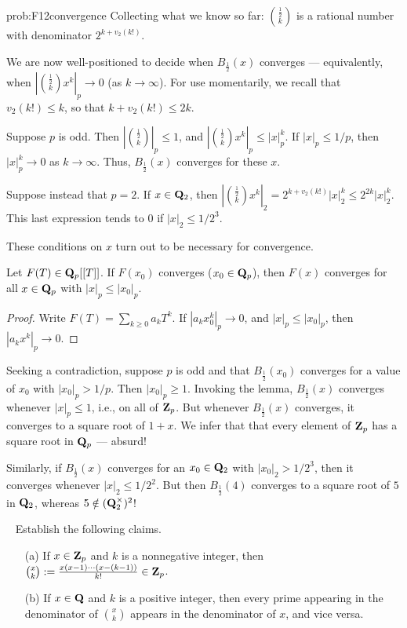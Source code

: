 \begin{sol}{prob:F12convergence}
Collecting what we know so far: $\binom{\frac12}{k}$ is a rational number with denominator $2^{k+v_2(k!)}$.

We are now well-positioned to decide when $B_{\frac{1}{2}}(x)$ converges --- equivalently, when $|\binom{\frac{1}{2}}{k} x^k|_p \to 0$ (as $k\to\infty$). For use momentarily, we recall that $v_2(k!) \le k$, so that $k+v_2(k!) \le 2k$. 


Suppose $p$ is odd. Then $|\binom{\frac12}{k}|_p\le 1$, and $|\binom{\frac{1}{2}}{k} x^k|_p \le |x|_p^{k}$. If $|x|_p \le 1/p$, then $|x|_p^{k} \to 0$ as $k\to\infty$. Thus, $B_{\frac{1}{2}}(x)$ converges for these $x$.

Suppose instead that $p=2$. If $x \in \mathbf{Q}_2$, then $|\binom{\frac{1}{2}}{k} x^k|_2 = 2^{k+v_2(k!)} |x|_2^{k}\le 2^{2k} |x|_2^{k}$. This last expression tends to $0$ if $|x|_2 \le 1/2^{3}$. 

These conditions on $x$ turn out to be   necessary for convergence. 

\begin{lem} Let $F(T) \in \mathbf{Q}_p[[T]]$. If $F(x_0)$ converges ($x_0 \in \mathbf{Q}_p$), then $F(x)$ converges for all $x \in \mathbf{Q}_p$ with $|x|_p \le |x_0|_p$.
\end{lem}
\begin{proof} Write $F(T) = \sum_{k\ge 0} a_k T^k$. If $|a_k x_0^k|_p\to 0$, and $|x|_p \le |x_0|_p$, then  $|a_k x^k|_p\to 0$.
\end{proof}

Seeking a contradiction, suppose $p$ is odd and that $B_{\frac12}(x_0)$ converges for a value of $x_0$ with $|x_0|_p > 1/p$. Then $|x_0|_p \ge 1$. Invoking the lemma, $B_{\frac12}(x)$ converges whenever $|x|_p\le 1$, i.e., on all of $\mathbf{Z}_p$. But whenever $B_{\frac12}(x)$ converges, it converges to a square root of $1+x$. We infer that that every element of $\mathbf{Z}_p$ has a square root in $\mathbf{Q}_p$ --- absurd! 

Similarly, if $B_{\frac{1}{2}}(x)$ converges for an $x_0\in \mathbf{Q}_2$ with $|x_0|_2 > 1/2^3$, then it converges whenever $|x|_2 \le 1/2^2$. But then $B_{\frac{1}{2}}(4)$ converges to a square root of $5$ in $\mathbf{Q}_2$, whereas $5 \notin (\mathbf{Q}_2^{\times})^2$!
\end{sol}

\begin{challenge}\label{pp:binomial0}\mbox{ }
\vspace{-0.12in} Establish the following claims.
\begin{enumerate}
    \item[(a)] If $x \in \mathbf{Z}_p$ and $k$ is a nonnegative integer, then $\binom{x}{k}:= \frac{x(x-1)\cdots(x-(k-1))}{k!} \in \mathbf{Z}_{p}$.
    \item[(b)] If $x \in \mathbf{Q}$ and $k$ is a positive integer, then every prime appearing in the denominator of $\binom{x}{k}$ appears in the denominator of $x$, and vice versa.
\end{enumerate}
\end{challenge}

